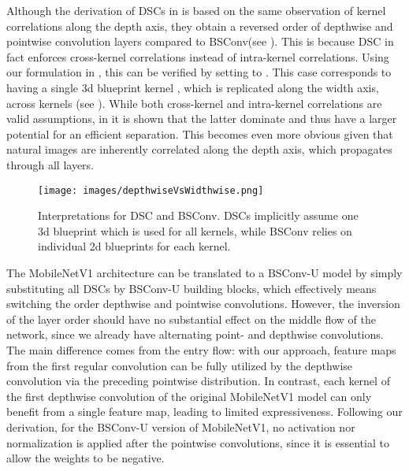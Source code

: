 \documentclass[10pt,twocolumn,letterpaper]{article}
\newcommand{\DCCK}{BSConv\xspace}
\newcommand{\DCCKU}{\DCCK-U\xspace}
\begin{document}
Although the derivation of DSCs in \cite{sifre2014rigid} is based on the same observation of kernel correlations along the depth axis, they obtain a reversed order of depthwise and pointwise convolution layers compared to \DCCK (see ).
This is because DSC in fact enforces cross-kernel correlations instead of intra-kernel correlations.
Using our formulation in , this can be verified by setting  to .
This case corresponds to having a single 3d  blueprint kernel , which is replicated along the width axis, \ie across kernels (see ).
While both cross-kernel and intra-kernel correlations are valid assumptions, in \cite{guo2018network} it is shown that the latter dominate and thus have a larger potential for an efficient separation.
This becomes even more obvious given that natural images are inherently correlated along the depth axis, which propagates through all layers.

\begin{figure}
	\center
	\texttt{[image: images/depthwiseVsWidthwise.png]}
	\caption{Interpretations for DSC and \DCCK.
		DSCs implicitly assume one 3d blueprint which is used for all kernels, while \DCCK relies on individual 2d blueprints for each kernel.
	}
	\label{fig:depthwiseVsWidthwise}
\end{figure}

The MobileNetV1 architecture can be translated to a \DCCKU model by simply substituting all DSCs by \DCCKU building blocks, which effectively means switching the order depthwise and pointwise convolutions.
However, the inversion of the layer order should have no substantial effect on the middle flow of the network, since we already have alternating point- and depthwise convolutions.
The main difference comes from the entry flow: with our approach, feature maps from the first regular convolution can be fully utilized by the depthwise convolution via the preceding pointwise distribution.
In contrast, each kernel of the first depthwise convolution of the original MobileNetV1 model can only benefit from a single feature map, leading to limited expressiveness.
Following our derivation, for the \DCCKU version of MobileNetV1, no activation nor normalization is applied after the pointwise convolutions, since it is essential to allow the weights  to be negative.
\end{document}

